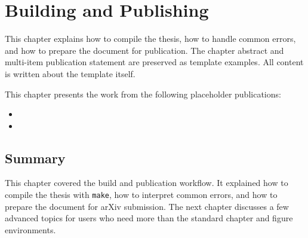 \chapter{Building and Publishing}
\glsresetall

\begin{cabstract}
This chapter explains how to compile the thesis, how to handle common errors, and how to prepare the document for publication. The chapter abstract and multi-item publication statement are preserved as template examples. All content is written about the template itself.
\end{cabstract}

This chapter presents the work from the following placeholder publications:

\begin{itemize}
\item {}
\item {}
\end{itemize}







\section{Summary}\label{ch5sec:summary}

This chapter covered the build and publication workflow. It explained how to compile the thesis with \texttt{make}, how to interpret common errors, and how to prepare the document for arXiv submission. The next chapter discusses a few advanced topics for users who need more than the standard chapter and figure environments.
